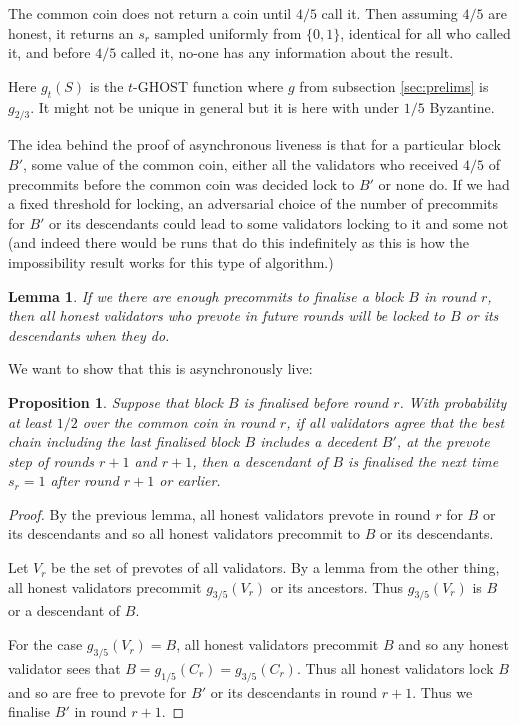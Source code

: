 \documentclass{article}
\newtheorem{lemma}[theorem]{Lemma}
\newtheorem{proposition}[theorem]{Proposition}
\begin{document}
{The common coin does not return a coin until $4/5$ call it. Then assuming $4/5$ are honest, it returns an $s_r$ sampled uniformly from $\{0,1\}$, identical for all who called it, and before $4/5$ called it, no-one has any information about the result.

Here $g_{t}(S)$ is the $t$-GHOST function where $g$ from subsection \ref{sec:prelims} is $g_{2/3}$. It might not be unique in general but it is here with under $1/5$ Byzantine.

The idea behind the proof of asynchronous liveness is that for a particular block $B'$, some value of the common coin, either all the validators who received $4/5$ of precommits before the common coin was decided lock to $B'$ or none do. If we had a fixed threshold for locking, an adversarial choice of the number of precommits for $B'$ or its descendants could lead to some validators locking to it and some not (and indeed there would be runs that do this indefinitely as this is how the impossibility result works for this type of algorithm.)

\begin{lemma} If we there are enough precommits to finalise a block $B$ in round $r$, then all honest validators who prevote in future rounds will be locked to $B$ or its descendants when they do.
\end{lemma}

We want to show that this is asynchronously live:

\begin{proposition} Suppose that block $B$ is finalised before round $r$. With probability at least $1/2$ over the common coin in round $r$, if all validators agree that the best chain including the last finalised block $B$ includes a decedent $B'$, at the prevote step of rounds $r+1$ and $r+1$, then a descendant of $B$ is finalised the next time $s_r=1$ after round $r+1$ or earlier.
\end{proposition}

\begin{proof} By the previous lemma, all honest validators prevote in round $r$ for $B$ or its descendants and so all honest validators precommit to $B$ or its descendants.

Let $V_r$ be the set of prevotes of all validators.  By a lemma from the other thing, all honest validators precommit $g_{3/5}(V_r)$ or its ancestors. Thus $g_{3/5}(V_r)$ is $B$ or a descendant of $B$.

For the case $g_{3/5}(V_r)=B$, all honest validators precommit $B$ and so any honest validator sees that
$B = g_{1/5}(C_r) = g_{3/5}(C_r)$. Thus all honest validators
lock $B$ and so are free to prevote for $B'$ or its descendants in round $r+1$. Thus we finalise $B'$ in round $r+1$.


\end{proof}}
\end{document}
